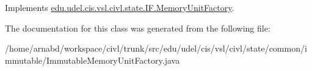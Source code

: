 Implements \hyperlink{interfaceedu_1_1udel_1_1cis_1_1vsl_1_1civl_1_1state_1_1IF_1_1MemoryUnitFactory_a8142f2c1e6ef3c9bfbe12355ffe3f133}{edu.\+udel.\+cis.\+vsl.\+civl.\+state.\+I\+F.\+Memory\+Unit\+Factory}.



The documentation for this class was generated from the following file\+:\begin{DoxyCompactItemize}
\item 
/home/arnabd/workspace/civl/trunk/src/edu/udel/cis/vsl/civl/state/common/immutable/Immutable\+Memory\+Unit\+Factory.\+java\end{DoxyCompactItemize}
